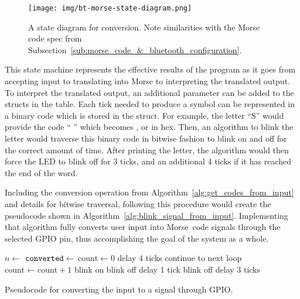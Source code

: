 \documentclass[11pt]{article}
\begin{document}
\begin{figure}[ht]
    \centering
    \texttt{[image: img/bt-morse-state-diagram.png]}
    \caption{A state diagram for conversion. Note similarities with the Morse code spec from Subsection~\ref{sub:morse_code_&_bluetooth_configuration}.}
    \label{fig:bt-morse-state-diagram}
\end{figure}


This state machine represents the effective results of the program as it goes from accepting input to translating into Morse to interpreting the translated output.
To interpret the translated output, an additional parameter can be added to the structs in the table.
Each tick needed to produce a symbol can be represented in a binary code which is stored in the struct.
For example, the letter ``S'' would provide the code ``\mcdot{} \mcdot{} \mcdot{}'' which becomes , or  in hex.
Then, an algorithm to blink the letter would traverse this binary code in bitwise fashion to blink on and off for the correct amount of time.
After printing the letter, the algorithm would then force the LED to blink off for 3 ticks, and an additional 4 ticks if it has reached the end of the word.


Including the conversion operation from Algorithm~\ref{alg:get_codes_from_input} and details for bitwise traversal, following this procedure would create the pseudocode shown in Algorithm~\ref{alg:blink_signal_from_input}.
Implementing that algorithm fully converts user input into Morse~code signals through the selected GPIO pin, thus accomplishing the goal of the system as a whole.


\begin{algorithm}[ht]
    \begin{algorithmic}[l]
        \State $n \gets$ 
        \State $\texttt{converted} \gets$ 
            \State $\text{count} \gets 0$
                \State delay 4 ticks
                \State continue to next loop
            \EndIf
                \State $\text{count} \gets \text{count} + 1$
            \EndWhile
                    \State blink on
                \Else
                    \State blink off
                \EndIf
                \State delay 1 tick
            \EndFor
            \State blink off
            \State delay 3 ticks
        \EndFor
        \EndProcedure
    \end{algorithmic}
    \caption{Pseudocode for converting the input to a signal through GPIO.}
    \label{alg:blink_signal_from_input}
\end{algorithm}
\end{document}
